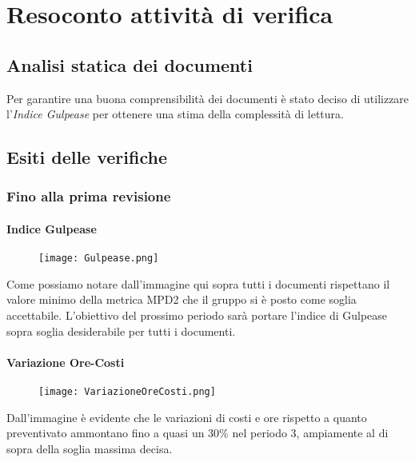 \chapter{Resoconto attività di verifica}
\section{Analisi statica dei documenti}
Per garantire una buona comprensibilità dei documenti è stato deciso di utilizzare l'\textit{Indice Gulpease} per ottenere una stima della complessità di lettura.
\section{Esiti delle verifiche}
    \subsection{Fino alla prima revisione}
      \subsubsection{Indice Gulpease}  
        \begin{figure}[h!]
            \centering
            \texttt{[image: Gulpease.png]}
        \end{figure}
        Come possiamo notare dall'immagine qui sopra tutti i documenti rispettano il valore minimo della metrica MPD2 che il gruppo si è posto come soglia accettabile. L'obiettivo del prossimo periodo sarà portare l'indice di Gulpease sopra soglia desiderabile per tutti i documenti. 
      \subsubsection{Variazione Ore-Costi}  
        \begin{figure}[h!]
            \centering
            \texttt{[image: VariazioneOreCosti.png]}
        \end{figure}
        Dall'immagine è evidente che le variazioni di costi e ore rispetto a quanto preventivato ammontano fino a quasi un 30\% nel periodo 3, ampiamente al di sopra della soglia massima decisa.
